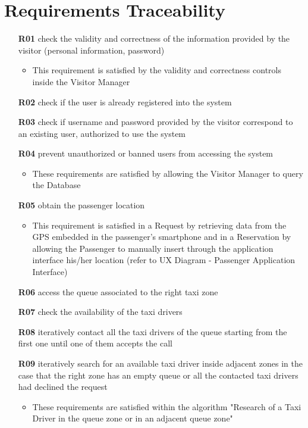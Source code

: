\chapter{Requirements Traceability} \label{chap5}
\begin{itemize}
	\item [\textbf{R01}] check the validity and correctness of the information provided by the visitor (personal information, password)
	\begin{itemize}
		\item This requirement is satisfied by the validity and correctness controls inside the Visitor Manager
	\end{itemize}

	\item [\textbf{R02}] check if the user is already registered into the system
	\item [\textbf{R03}] check if username and password provided by the visitor correspond to an existing user, authorized to use the system
	\item [\textbf{R04}] prevent unauthorized or banned users from accessing the system
	\begin{itemize}
		\item These requirements are satisfied by allowing the Visitor Manager to query the Database
	\end{itemize}
	
	\item [\textbf{R05}] obtain the passenger location
	\begin{itemize}
		\item This requirement is satisfied in a Request by retrieving data from the GPS embedded in the passenger's smartphone and in a Reservation by allowing the Passenger to manually insert through the application interface his/her location (refer to UX Diagram - Passenger Application Interface)
	\end{itemize}

	\item [\textbf{R06}] access the queue associated to the right taxi zone
	\item [\textbf{R07}] check the availability of the taxi drivers 
	\item [\textbf{R08}] iteratively contact all the taxi drivers of the queue starting from the first one until one of them accepts the call
	\item [\textbf{R09}] iteratively search for an available taxi driver inside adjacent zones in the case that the right zone has an empty queue or all the contacted taxi drivers had declined the request
	\begin{itemize}
		\item These requirements are satisfied within the algorithm "Research of a Taxi Driver in the queue zone or in an adjacent queue zone"
	\end{itemize}


\end{itemize}
